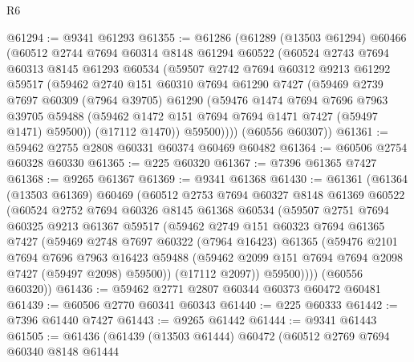 \begin{lexlean}{R6}
\begin{coremodule}
@61294 := @9341 @61293
@61355 := @61286
    (@61289
      (@13503 @61294)
      @60466
      (@60512
        @2744
        @7694
        @60314
        @8148
        @61294
        @60522
        (@60524
          @2743
          @7694
          @60313
          @8145
          @61293
          @60534
          (@59507
            @2742
            @7694
            @60312
            @9213
            @61292
            @59517
            (@59462
              @2740
              @151
              @60310
              @7694
              @61290
              @7427
              (@59469
                @2739
                @7697
                @60309
                (@7964 @39705)
                @61290
                (@59476
                  @1474
                  @7694
                  @7696
                  @7963
                  @39705
                  @59488
                  (@59462 @1472 @151 @7694 @7694 @1471 @7427 (@59497 @1471) @59500))
                (@17112 @1470))
              @59500))))
      (@60556 @60307))
@61361 := @59462 @2755 @2808 @60331 @60374 @60469 @60482
@61364 := @60506 @2754 @60328 @60330
@61365 := @225 @60320
@61367 := @7396 @61365 @7427
@61368 := @9265 @61367
@61369 := @9341 @61368
@61430 := @61361
    (@61364
      (@13503 @61369)
      @60469
      (@60512
        @2753
        @7694
        @60327
        @8148
        @61369
        @60522
        (@60524
          @2752
          @7694
          @60326
          @8145
          @61368
          @60534
          (@59507
            @2751
            @7694
            @60325
            @9213
            @61367
            @59517
            (@59462
              @2749
              @151
              @60323
              @7694
              @61365
              @7427
              (@59469
                @2748
                @7697
                @60322
                (@7964 @16423)
                @61365
                (@59476
                  @2101
                  @7694
                  @7696
                  @7963
                  @16423
                  @59488
                  (@59462 @2099 @151 @7694 @7694 @2098 @7427 (@59497 @2098) @59500))
                (@17112 @2097))
              @59500))))
      (@60556 @60320))
@61436 := @59462 @2771 @2807 @60344 @60373 @60472 @60481
@61439 := @60506 @2770 @60341 @60343
@61440 := @225 @60333
@61442 := @7396 @61440 @7427
@61443 := @9265 @61442
@61444 := @9341 @61443
@61505 := @61436
    (@61439
      (@13503 @61444)
      @60472
      (@60512
        @2769
        @7694
        @60340
        @8148
        @61444

\end{coremodule}
\end{lexlean}
